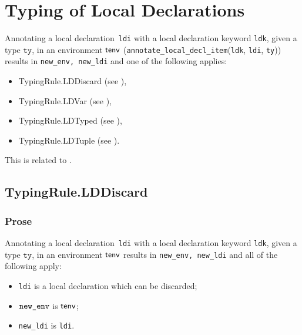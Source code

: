 \documentclass{book}
\newcommand\annotatelocaldeclitem[1]{\texttt{annotate\_local\_decl\_item}(#1)}
\newcommand\ldi[0]{\texttt{ldi}}
\newcommand\ldk[0]{\texttt{ldk}}
\newcommand\tty[0]{\texttt{ty}}
\begin{document}

\chapter{Typing of Local Declarations}

Annotating a local declaration~\texttt{ldi} with a local declaration keyword \texttt{ldk}, given a type $\tty$, in an
environment $\textsf{tenv}$ (\annotatelocaldeclitem{\ldk, \ldi, \tty}) results in \texttt{new\_env, new\_ldi} and one of the following applies:
\begin{itemize}
\item TypingRule.LDDiscard (see ),
\item TypingRule.LDVar (see ),
\item TypingRule.LDTyped (see ),
\item TypingRule.LDTuple (see ).
\end{itemize}

This is related to .

\section{TypingRule.LDDiscard \label{sec:TypingRule.LDDiscard}}

  \subsection{Prose}
    Annotating a local declaration~\texttt{ldi} with a local declaration keyword \texttt{ldk}, given a type $\tty$, in
an environment $\textsf{tenv}$ results in \texttt{new\_env, new\_ldi} and all of
the following apply:
   \begin{itemize}
   \item \texttt{ldi} is a local declaration which can be discarded;
   \item $\texttt{new\_env}$ is $\textsf{tenv}$;
   \item \texttt{new\_ldi} is \texttt{ldi}.
   \end{itemize}
\end{document}
